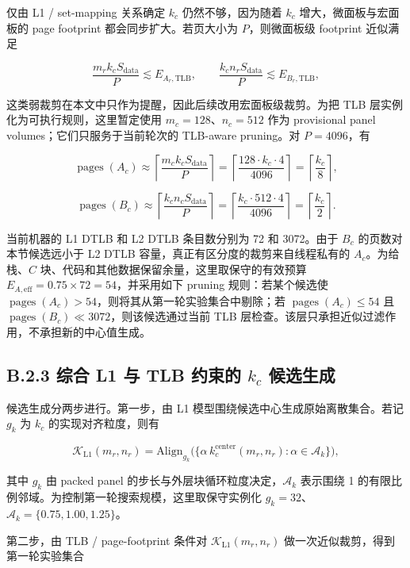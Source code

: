 \documentclass[a4paper,11pt,oneside]{article}
\begin{document}
仅由 L1 / set-mapping 关系确定 $k_c$ 仍然不够，因为随着 $k_c$ 增大，微面板与宏面板的 page footprint 都会同步扩大。若页大小为 $P$，则微面板级 footprint 近似满足

$$
\frac{m_r k_c S_{\text{data}}}{P} \lesssim E_{A_r,\mathrm{TLB}},
\qquad
\frac{k_c n_r S_{\text{data}}}{P} \lesssim E_{B_r,\mathrm{TLB}},
$$

这类弱裁剪在本文中只作为提醒，因此后续改用宏面板级裁剪。为把 TLB 层实例化为可执行规则，这里暂定使用 $m_c=128$、$n_c=512$ 作为 provisional panel volumes；它们只服务于当前轮次的 TLB-aware pruning。对 $P=4096$，有

$$
\operatorname{pages}(A_c) \approx \left\lceil \frac{m_c k_c S_{\text{data}}}{P} \right\rceil
= \left\lceil \frac{128 \cdot k_c \cdot 4}{4096} \right\rceil
= \left\lceil \frac{k_c}{8} \right\rceil,
$$

$$
\operatorname{pages}(B_c) \approx \left\lceil \frac{k_c n_c S_{\text{data}}}{P} \right\rceil
= \left\lceil \frac{k_c \cdot 512 \cdot 4}{4096} \right\rceil
= \left\lceil \frac{k_c}{2} \right\rceil.
$$

当前机器的 L1 DTLB 和 L2 DTLB 条目数分别为 72 和 3072。由于 $B_c$ 的页数对本节候选远小于 L2 DTLB 容量，真正有区分度的裁剪来自线程私有的 $A_c$。为给栈、$C$ 块、代码和其他数据保留余量，这里取保守的有效预算 $E_{A,\mathrm{eff}}=0.75 \times 72 = 54$，并采用如下 pruning 规则：若某个候选使 $\operatorname{pages}(A_c) > 54$，则将其从第一轮实验集合中剔除；若 $\operatorname{pages}(A_c) \le 54$ 且 $\operatorname{pages}(B_c) \ll 3072$，则该候选通过当前 TLB 层检查。该层只承担近似过滤作用，不承担新的中心值生成。

\subsection*{B.2.3 综合 L1 与 TLB 约束的 $k_c$ 候选生成}

候选生成分两步进行。第一步，由 L1 模型围绕候选中心生成原始离散集合。若记 $g_k$ 为 $k_c$ 的实现对齐粒度，则有

$$
\mathcal{K}_{\mathrm{L1}}(m_r,n_r) = \mathrm{Align}_{g_k}\bigl(\{ \alpha\, k_c^{\text{center}}(m_r,n_r) : \alpha \in \mathcal{A}_k \}\bigr),
$$

其中 $g_k$ 由 packed panel 的步长与外层块循环粒度决定，$\mathcal{A}_k$ 表示围绕 1 的有限比例邻域。为控制第一轮搜索规模，这里取保守实例化 $g_k=32$、$\mathcal{A}_k=\{0.75,1.00,1.25\}$。

第二步，由 TLB / page-footprint 条件对 $\mathcal{K}_{\mathrm{L1}}(m_r,n_r)$ 做一次近似裁剪，得到第一轮实验集合
\end{document}
